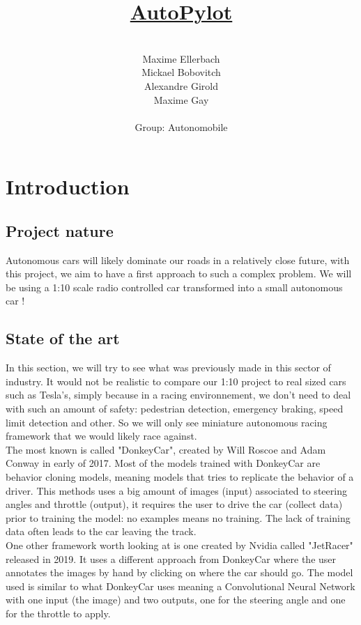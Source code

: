 \documentclass[12pt]{article}
\title{\underline{AutoPylot}}
\date{}
\author{%
    \\
    Maxime Ellerbach \\
    Mickael Bobovitch \\
    Alexandre Girold \\
    Maxime Gay \\ \\
    Group: Autonomobile 
    }
\begin{document}
\maketitle
\newpage

\tableofcontents
\newpage

\section{Introduction}

\subsection{Project nature}
Autonomous cars will likely dominate our roads in a relatively close future,
with this project, we aim to have a first approach to such a complex problem.
We will be using a 1:10 scale radio controlled car transformed into a small autonomous car !

\subsection{State of the art}

In this section, we will try to see what was previously made in this sector of industry.
It would not be realistic to compare our 1:10 project to real sized cars such as Tesla's, simply because in a racing environnement,
we don't need to deal with such an amount of safety: pedestrian detection, emergency braking, speed limit detection and other.
So we will only see miniature autonomous racing framework that we would likely race against.\\

The most known is called "DonkeyCar", created by Will Roscoe and Adam Conway in early of 2017. Most of the models trained with DonkeyCar are behavior cloning models, meaning models that tries to replicate the behavior of a driver. This methods uses a big amount of images (input) associated to steering angles and throttle (output), it requires the user to drive the car (collect data) prior to training the model: no examples means no training. The lack of training data often leads to the car leaving the track.\\

One other framework worth looking at is one created by Nvidia called "JetRacer" released in 2019. It uses a different approach from DonkeyCar where the user annotates the images by hand by clicking on where the car should go. The model used is similar to what DonkeyCar uses meaning a Convolutional Neural Network with one input (the image) and two outputs, one for the steering angle and one for the throttle to apply.
\end{document}
